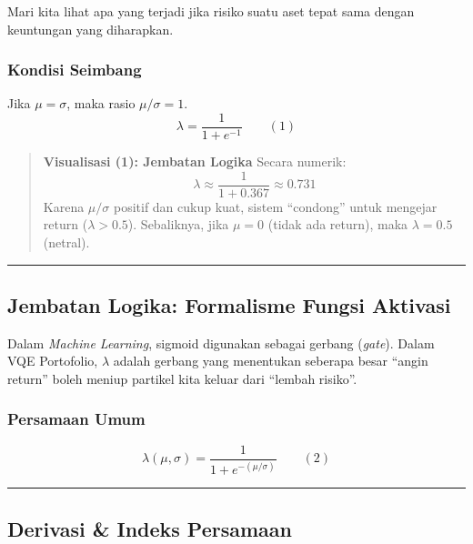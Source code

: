 Mari kita lihat apa yang terjadi jika risiko suatu aset tepat sama dengan keuntungan yang diharapkan.

\hypertarget{a.-kondisi-seimbang}{%
\subsubsection{Kondisi Seimbang}\label{a.-kondisi-seimbang}}

Jika \(\mu = \sigma\), maka rasio \(\mu/\sigma = 1\). \[ \lambda = \frac{1}{1 + e^{-1}} \qquad (1) \]

\begin{quote}
\textbf{Visualisasi (1): Jembatan Logika} Secara numerik: \[ \lambda \approx \frac{1}{1 + 0.367} \approx 0.731 \] Karena \(\mu/\sigma\) positif dan cukup kuat, sistem ``condong'' untuk mengejar return (\(\lambda > 0.5\)). Sebaliknya, jika \(\mu = 0\) (tidak ada return), maka \(\lambda = 0.5\) (netral).
\end{quote}

\begin{center}\rule{0.5\linewidth}{0.5pt}\end{center}

\hypertarget{jembatan-logika-formalisme-fungsi-aktivasi}{%
\subsection{Jembatan Logika: Formalisme Fungsi Aktivasi}\label{jembatan-logika-formalisme-fungsi-aktivasi}}

Dalam \emph{Machine Learning}, sigmoid digunakan sebagai gerbang (\emph{gate}). Dalam VQE Portofolio, \(\lambda\) adalah gerbang yang menentukan seberapa besar ``angin return'' boleh meniup partikel kita keluar dari ``lembah risiko''.

\hypertarget{a.-persamaan-umum}{%
\subsubsection{Persamaan Umum}\label{a.-persamaan-umum}}

\[ \lambda(\mu, \sigma) = \frac{1}{1 + e^{-(\mu/\sigma)}} \qquad (2) \]

\begin{center}\rule{0.5\linewidth}{0.5pt}\end{center}

\hypertarget{derivasi-indeks-persamaan}{%
\subsection{Derivasi \& Indeks Persamaan}\label{derivasi-indeks-persamaan}}


